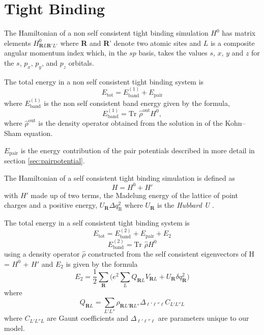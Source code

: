 \documentclass[reprint,]{revtex4-2}
\begin{document}
\section{Tight Binding}
The Hamiltonian of a non self consistent tight binding simulation $H^{0}$ has matrix elements $H^{0}_{\textbf{R}L\textbf{R}'L'}$ where \textbf{R} and \textbf{R}' denote two atomic sites and $L$ is a composite angular momentum index which, in the $sp$ basis, takes the values $s$, $x$, $y$ and $z$ for the $s$, $p_{x}$, $p_{y}$, and $p_{z}$ orbitals.

The total energy in a non self consistent tight binding system is
\begin{equation}
	E_{\text{tot}}=E^{(1)}_{\text{band}}+E_{\text{pair}}
\end{equation}
where $E^{(1)}_{\text{band}}$ is the non self consistent band energy given by the formula,
\begin{equation}
	E^{(1)}_{\text{band}}=\textrm{Tr }\hat{\rho}^{\text{out}}H^0,
\end{equation}
where $\hat{\rho}^{\text{out}}$ is the density operator obtained from the solution in
of the Kohn–Sham equation.\cite{Kohn1964}

$E_{\text{pair}}$ is the energy contribution of the pair potentials described in more detail in section \ref{sec:pairpotential}.

The Hamiltonian of a self consistent tight binding simulation is defined as 
\begin{equation}
	H=H^{0} +H'
\end{equation}
with $H'$ made up of two terms, the Madelung energy of the lattice of point charges \cite{Madelung1919} and a positive energy, $U_{\textbf{R}}\Delta q_{\text{R}}^{2}$ where $U_{\textbf{R}}$ is the \textit{Hubbard U} \cite{Hubbard1963}.

The total energy in a self consistent tight binding system is
\begin{equation}
	E_{\text{tot}}=E^{(2)}_{\text{band}}+E_{\text{pair}}+E_{2}
\end{equation} 
\begin{equation}
	E^{(2)}_{\text{band}}=\textrm{Tr }\hat{\rho}H^0
\end{equation}
using a density operator $\hat{\rho}$ constructed from the self consistent eigenvectors of H = $H^0$ + $H'$ and $E_{2}$ is given by the formula
\begin{equation}
\label{eq:Electrostatic}
	E_{2}=\frac{1}{2}\sum_{\textbf{R}}\bigg(e^{2}\sum_{L}Q_{\textbf{R}L}V_{\textbf{R}L}+U_{\textbf{R}}\delta q^{2}_{\textbf{R}}\bigg)
\end{equation}
where
\begin{equation}
	\label{eq:multipole}
	Q_{\textbf{R}L}=\sum_{L'L''}\rho_{\textbf{R}L'\textbf{R}L''}\Delta_{\ell'\ell''\ell}C_{L'L''L}
\end{equation}
where $C_{L'L''L}$ are Gaunt coefficients \cite{Paxton2009} and $\Delta_{\ell'\ell''\ell}$ are parameters unique to our model.
\end{document}
